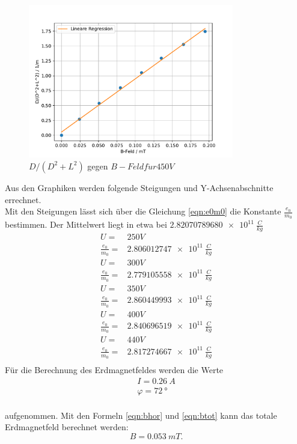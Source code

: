 \begin{figure}[h!]
 \centering
 \includegraphics[width=0.8\textwidth]{1-450V.pdf}
 \caption{$D/(D^2+L^2)$ gegen $B-Feld f\ddot{u}r 450V$}
 \label{fig:1-450V}
\end{figure}
Aus den Graphiken werden folgende Steigungen und Y-Achsenabschnitte errechnet.
\\Mit den Steigungen lässt sich über die Gleichung \ref{eqn:e0m0} die Konstante $\frac{e_0}{m_0}$ bestimmen.
\FloatBarrier
Der Mittelwert liegt in etwa bei $\SI{2,82070789680e11}{\frac{C}{kg}}$
\begin{align*}
  U=&250V\\
  \frac{e_0}{m_0} =& \SI{2,806012747e11}{\frac{C}{kg}}\\
  U=&300V\\
  \frac{e_0}{m_0} =& \SI{2,779105558e11}{\frac{C}{kg}}\\
  U=&350V\\
  \frac{e_0}{m_0} =& \SI{2,860449993e11}{\frac{C}{kg}}\\
  U=&400V\\
  \frac{e_0}{m_0} =& \SI{2,840696519e11}{\frac{C}{kg}}\\
  U=&440V\\
  \frac{e_0}{m_0} =& \SI{2,817274667e11}{\frac{C}{kg}}\\
\end{align*}
Für die Berechnung des Erdmagnetfeldes werden die Werte
\begin{align*}
  I =\SI{ 0,26}{A}\\
  \varphi = \SI{72}{°}
\end{align*}
\\aufgenommen.
Mit den Formeln \ref{eqn:bhor} und \ref{eqn:btot} kann das totale Erdmagnetfeld berechnet werden:
\begin{equation*}
  B = \SI{0,053}{mT}.
\end{equation*}
\FloatBarrier
